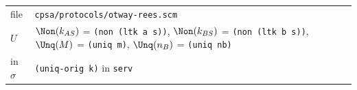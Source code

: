 \par\smallskip\noindent\begin{tabular}{@{}l p{}@{}}
file & \texttt{cpsa/protocols/otway-rees.scm}\\
$U$ & $\Non(k_{AS})$ = \texttt{(non (ltk a s))}, $\Non(k_{BS})$ = \texttt{(non (ltk b s))}, $\Unq(M)$ = \texttt{(uniq m)}, $\Unq(n_B)$ = \texttt{(uniq nb)}\\
in $\sigma$ & \texttt{(uniq-orig k)} in \texttt{serv}\\
\end{tabular}

